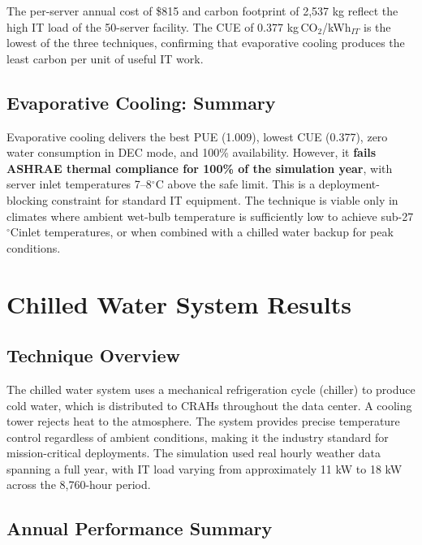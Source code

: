 ﻿\documentclass[12pt,a4paper]{report}
\newcommand{\degC}{$^{\circ}$C}
\begin{document}
\noindent The per-server annual cost of \$815 and carbon footprint of 2{,}537 kg reflect the
high IT load of the 50-server facility. The CUE of 0.377 kg\,CO$_2$/kWh$_{IT}$ is the
lowest of the three techniques, confirming that evaporative cooling produces the least
carbon per unit of useful IT work.

\subsection{Evaporative Cooling: Summary}

Evaporative cooling delivers the best PUE (1.009), lowest CUE (0.377), zero water
consumption in DEC mode, and 100\% availability. However, it \textbf{fails ASHRAE thermal
compliance for 100\% of the simulation year}, with server inlet temperatures 7--8\degC
above the safe limit. This is a deployment-blocking constraint for standard IT equipment.
The technique is viable only in climates where ambient wet-bulb temperature is sufficiently
low to achieve sub-27\degC inlet temperatures, or when combined with a chilled water
backup for peak conditions.

\section{Chilled Water System Results}
\label{sec:chilled}

\subsection{Technique Overview}

The chilled water system uses a mechanical refrigeration cycle (chiller) to produce cold
water, which is distributed to CRAHs throughout the data center. A cooling tower rejects
heat to the atmosphere. The system provides precise temperature control regardless of
ambient conditions, making it the industry standard for mission-critical deployments.
The simulation used real hourly weather data spanning a full year, with IT load varying
from approximately 11 kW to 18 kW across the 8{,}760-hour period.

\subsection{Annual Performance Summary}
\end{document}
